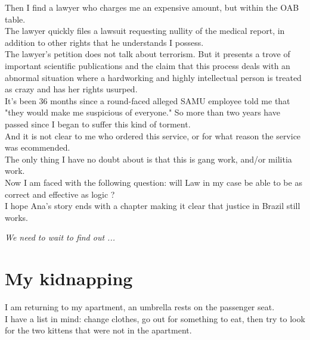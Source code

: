 \documentclass[11pt]{book}
\begin{document}
\noindent Then I find a lawyer who charges me an expensive amount, but within the OAB table. \\

\noindent The lawyer quickly files a lawsuit requesting nullity of the medical report, in addition to other rights that he understands I possess. \\

\noindent The lawyer's petition does not talk about terrorism. But it presents a trove of important scientific publications and the claim that this process deals with an abnormal situation where a hardworking and highly intellectual person is treated as crazy and has her rights usurped. \\

\noindent It's been 36 months since a round-faced alleged SAMU employee told me that "they would make me suspicious of everyone." So more than two years have passed since I began to suffer this kind of torment. \\

\noindent And it is not clear to me who ordered this service, or for what reason the service was ecommended. \\

\noindent The only thing I have no doubt about is that this is gang work, and/or militia work. \\

\noindent Now I am faced with the following question: will Law in my case be able to be as correct and effective as logic ? \\

\noindent I hope Ana's story ends with a chapter making it clear that justice in Brazil still works. \\

\noindent \begin{center} \emph{We need to wait to find out ...} \end{center}

\chapter{My kidnapping}

\noindent I am returning to my apartment, an umbrella rests on the passenger seat. \\

\noindent I have a list in mind: change clothes, go out for something to eat, then try to look for the two kittens that were not in the apartment. \\
\end{document}
